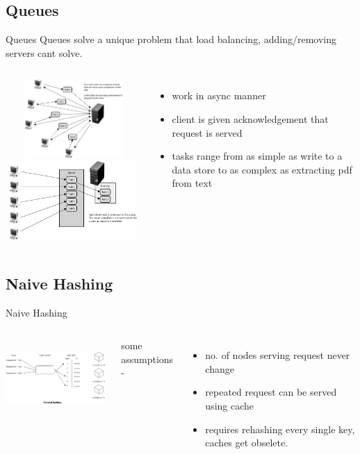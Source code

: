 \documentclass[9pt]{beamer}
\begin{document}
\subsection{Queues}
\begin{frame}{Queues}
  Queues solve a unique problem that load balancing, adding/removing servers cant solve.
  \pause
  \begin{columns}
    \includegraphics[width=55mm, height=30mm, scale=0.4]{img/queue_sync.png}
    \includegraphics[width=55mm, height=30mm, scale=0.4]{img/queue_async.png}

    \begin{itemize}
    \item work in async manner
    \item client is given acknowledgement that request is served
    \item tasks range from as simple as write to a data store to as complex as extracting pdf from text
    \end{itemize}
  \end{columns}
\end{frame}


\subsection{Naive Hashing}
\begin{frame}{Naive Hashing}
  \begin{columns}
    \includegraphics[width=60mm, height=30mm, scale=0.9]{img/naive hashing.png}

    some assumptions - 
    \begin{itemize}
    \item no. of nodes serving request never change
    \item repeated request can be served using cache
    \item requires rehashing every single key, caches get obselete.
    \end{itemize}
  \end{columns}
\end{frame}
\end{document}
